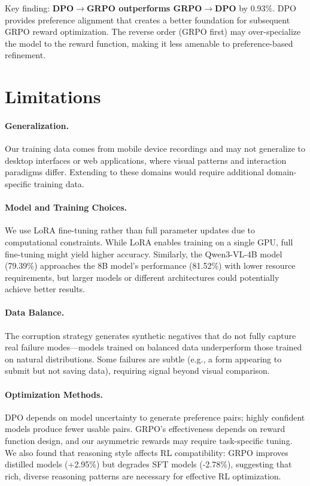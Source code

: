 \documentclass[11pt,a4paper]{article}
\begin{document}
Key finding: \textbf{DPO$\rightarrow$GRPO outperforms GRPO$\rightarrow$DPO} by 0.93\%. DPO provides preference alignment that creates a better foundation for subsequent GRPO reward optimization. The reverse order (GRPO first) may over-specialize the model to the reward function, making it less amenable to preference-based refinement.


\section{Limitations}

\paragraph{Generalization.} Our training data comes from mobile device recordings and may not generalize to desktop interfaces or web applications, where visual patterns and interaction paradigms differ. Extending to these domains would require additional domain-specific training data.

\paragraph{Model and Training Choices.} We use LoRA fine-tuning rather than full parameter updates due to computational constraints. While LoRA enables training on a single GPU, full fine-tuning might yield higher accuracy. Similarly, the Qwen3-VL-4B model (79.39\%) approaches the 8B model's performance (81.52\%) with lower resource requirements, but larger models or different architectures could potentially achieve better results.

\paragraph{Data Balance.} The corruption strategy generates synthetic negatives that do not fully capture real failure modes---models trained on balanced data underperform those trained on natural distributions. Some failures are subtle (e.g., a form appearing to submit but not saving data), requiring signal beyond visual comparison.

\paragraph{Optimization Methods.} DPO depends on model uncertainty to generate preference pairs; highly confident models produce fewer usable pairs. GRPO's effectiveness depends on reward function design, and our asymmetric rewards may require task-specific tuning. We also found that reasoning style affects RL compatibility: GRPO improves distilled models (+2.95\%) but degrades SFT models (-2.78\%), suggesting that rich, diverse reasoning patterns are necessary for effective RL optimization.
\end{document}
